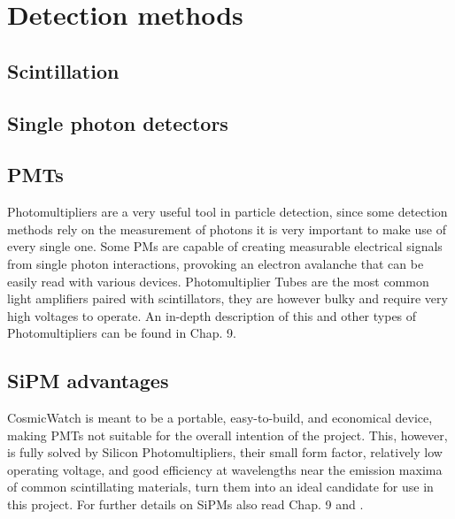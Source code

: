 \chapter{Detection methods} \label{chap:detection_methods}

\section{Scintillation}

\section{Single photon detectors}

\section{PMTs}

Photomultipliers are a very useful tool in particle detection, since some detection methods rely on the measurement of photons it is very important to make use of every single one. Some PMs are capable of creating measurable electrical signals from single photon interactions, provoking an electron avalanche that can be easily read with various devices. Photomultiplier Tubes are the most common light amplifiers paired with scintillators, they are however bulky and require very high voltages to operate. An in-depth description of this and other types of Photomultipliers can be found in \cite{knoll2010radiation} Chap. 9.

\section{SiPM advantages}

CosmicWatch is meant to be a portable, easy-to-build, and economical device, making PMTs not suitable for the overall intention of the project. This, however, is fully solved by Silicon Photomultipliers, their small form factor, relatively low operating voltage, and good efficiency at wavelengths near the emission maxima of common scintillating materials, turn them into an ideal candidate for use in this project. For further details on SiPMs also read \cite{knoll2010radiation} Chap. 9 and \cite{Onsemi_SiPM_intro}.

